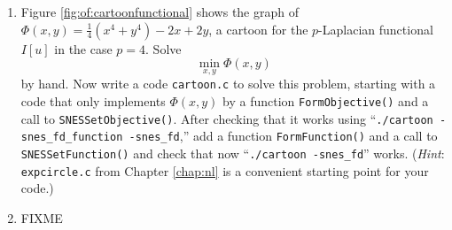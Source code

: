 \begin{enumerate}
\item Figure \ref{fig:of:cartoonfunctional} shows the graph of $\Phi(x,y)=\tfrac{1}{4}(x^4+y^4) - 2x + 2y$, a cartoon for the $p$-Laplacian functional $I[u]$ in the case $p=4$.  Solve
    $$\min_{x,y} \Phi(x,y)$$
by hand.  Now write a \PETSc code \texttt{cartoon.c} to solve this problem, starting with a code that only implements $\Phi(x,y)$ by a function \texttt{FormObjective()} and a call to \texttt{SNESSetObjective()}.  After checking that it works using ``\texttt{./cartoon -snes\_fd\_function -snes\_fd},'' add a function \texttt{FormFunction()} and a call to \texttt{SNESSetFunction()} and check that now ``\texttt{./cartoon -snes\_fd}'' works.  (\emph{Hint}:  \texttt{expcircle.c} from Chapter \ref{chap:nl} is a convenient starting point for your code.)

\item FIXME
\end{enumerate}